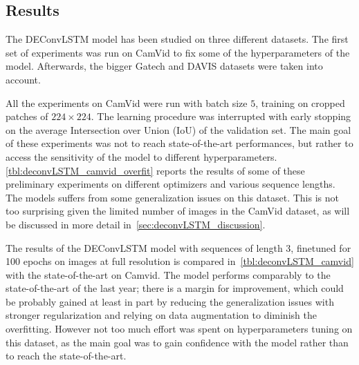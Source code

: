 \subsection{Results}\label{sec:deconvLSTM_results}

The DEConvLSTM model has been studied on three different datasets. The first
set of experiments was run on CamVid to fix some of the hyperparameters of the
model. Afterwards, the bigger Gatech and DAVIS datasets were taken into
account.

All the experiments on CamVid were run with batch size $5$, training on cropped
patches of $224 \times 224$. The learning procedure was interrupted with early
stopping on the average Intersection over Union (IoU) of the validation set.
The main goal of these experiments was not to reach state-of-the-art
performances, but rather to access the sensitivity of the model to different
hyperparameters. \autoref{tbl:deconvLSTM_camvid_overfit} reports the results of
some of these preliminary experiments on different optimizers and various
sequence lengths. The models suffers from some generalization issues on this
dataset. This is not too surprising given the limited number of images in the
CamVid dataset, as will be discussed in more detail
in~\autoref{sec:deconvLSTM_discussion}.

The results of the DEConvLSTM model with sequences of length $3$, finetuned for
100 epochs on images at full resolution is compared
in~\autoref{tbl:deconvLSTM_camvid} with the state-of-the-art on Camvid. The
model performs comparably to the state-of-the-art of the last year; there is a
margin for improvement, which could be probably gained at least in part by
reducing the generalization issues with stronger regularization and relying on
data augmentation to diminish the overfitting. However not too much effort was
spent on hyperparameters tuning on this dataset, as the main goal was to gain
confidence with the model rather than to reach the state-of-the-art.

\begin{table}[t]
    \caption{Results on the CamVid dataset. Pixel accuracy and average
        Intersection over Union (IoU) are reported.}
    \label{tbl:deconvLSTM_camvid}
\end{table}

